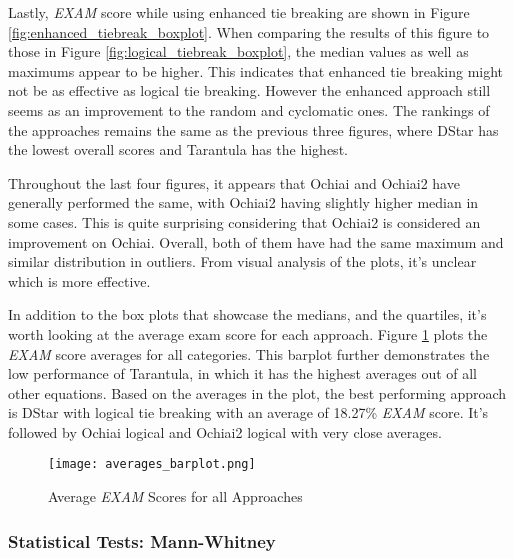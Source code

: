 Lastly, \emph{EXAM} score while using enhanced tie breaking are shown in Figure
\ref{fig:enhanced_tiebreak_boxplot}. When comparing the results of this figure
to those in Figure \ref{fig:logical_tiebreak_boxplot}, the median values as well
as maximums appear to be higher. This indicates that enhanced tie breaking might
not be as effective as logical tie breaking. However the enhanced approach still
seems as an improvement to the random and cyclomatic ones. The rankings of the
approaches remains the same as the previous three figures, where DStar has the
lowest overall scores and Tarantula has the highest.

Throughout the last four figures, it appears that Ochiai and Ochiai2 have
generally performed the same, with Ochiai2 having slightly higher median in some
cases. This is quite surprising considering that Ochiai2 is considered an
improvement on Ochiai. Overall, both of them have had the same maximum and
similar distribution in outliers. From visual analysis of the plots, it's
unclear which is more effective.

In addition to the box plots that showcase the medians, and the quartiles, it's
worth looking at the average exam score for each approach. Figure
\ref{fig:averages_barplot} plots the \emph{EXAM} score averages for all
categories. This barplot further demonstrates the low performance of Tarantula,
in which it has the highest averages out of all other equations. Based on the
averages in the plot, the best performing approach is DStar with logical tie
breaking with an average of 18.27\% \emph{EXAM} score. It's followed by Ochiai
logical and Ochiai2 logical with very close averages.

\begin{figure}[!htb]
	\begin{center}
		\texttt{[image: averages\_barplot.png]}
        \caption{\label{fig:averages_barplot} Average \emph{EXAM} Scores for all
        Approaches}
	\end{center}
\end{figure}

\subsubsection{Statistical Tests: Mann-Whitney}
\label{subsubsec:statistical_test_mann_whitney}

